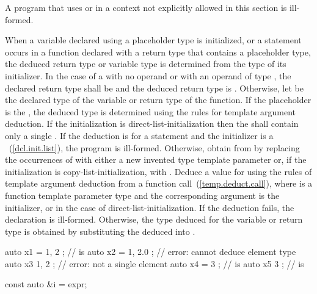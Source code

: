 \pnum
A program that uses  or  in a context not
explicitly allowed in this section is ill-formed.

\pnum
When a variable declared using a placeholder type is initialized, or a
 statement occurs in a function declared with a return type that
contains a placeholder type, the deduced return type or variable type is
determined from the type of its initializer. In the case of a 
with no operand or with an operand of type , the declared return
type shall be  and the deduced return type is .
Otherwise, let  be the declared type of the variable or return type of
the function.
If the placeholder is the  , the
deduced type is determined using the rules for template argument deduction.
If the initialization is direct-list-initialization
then the  shall contain
only a single  .
If the deduction is for a  statement and the initializer is a
~(\ref{dcl.init.list}), the program is
ill-formed. Otherwise, obtain  from
 by replacing the occurrences of  with either a new
invented type template parameter  or,
if the initialization is copy-list-initialization, with
. Deduce a value for  using the rules
of template argument deduction from a function call~(\ref{temp.deduct.call}),
where  is a
function template parameter type and
the corresponding argument is the initializer,
or  in the case of direct-list-initialization.
If the deduction fails, the declaration is ill-formed.
Otherwise, the type deduced for the variable or return type is obtained by
substituting the deduced  into .
\enterexample
\begin{codeblock}
auto x1 = { 1, 2 };         //  is 
auto x2 = { 1, 2.0 };       // error: cannot deduce element type
auto x3{ 1, 2 };            // error: not a single element
auto x4 = { 3 };            //  is 
auto x5{ 3 };               //  is 
\end{codeblock}
\exitexample

\enterexample
\begin{codeblock}
const auto &i = expr;
\end{codeblock}

